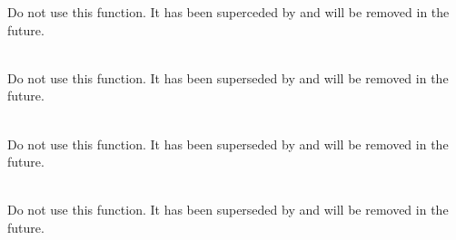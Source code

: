 \begin{DoxyRefList}
\label{deprecated__deprecated000013}%
%
Do not use this function. It has been superceded by  and will be removed in the future.  
\item[{\parbox[t]{\linewidth}{Global \doxylink{group___complex_f_f_t_deprecated_gab340cc2ca89d865287619ef70da7a62f}{arm\+\_\+cfft\+\_\+radix4\+\_\+init\+\_\+q15} (\doxylink{structarm__cfft__radix4__instance__q15}{arm\+\_\+cfft\+\_\+radix4\+\_\+instance\+\_\+q15} \texorpdfstring{$\ast$}{*}S, uint16\+\_\+t fft\+Len, uint8\+\_\+t ifft\+Flag, uint8\+\_\+t bit\+Reverse\+Flag)}}]\hfill \\
\label{deprecated__deprecated000014}%
%
Do not use this function. It has been superseded by  and will be removed in the future.  
\item[{\parbox[t]{\linewidth}{Global \doxylink{group___complex_f_f_t_deprecated_ga1102895d5206b25dec00e975e7f1c969}{arm\+\_\+cfft\+\_\+radix4\+\_\+init\+\_\+q31} (\doxylink{structarm__cfft__radix4__instance__q31}{arm\+\_\+cfft\+\_\+radix4\+\_\+instance\+\_\+q31} \texorpdfstring{$\ast$}{*}S, uint16\+\_\+t fft\+Len, uint8\+\_\+t ifft\+Flag, uint8\+\_\+t bit\+Reverse\+Flag)}}]\hfill \\
\label{deprecated__deprecated000015}%
%
Do not use this function. It has been superseded by  and will be removed in the future.  
\item[{\parbox[t]{\linewidth}{Global \doxylink{group___complex_f_f_t_deprecated_ga5f5e95ea7a6ad235f0fb7aff0eb55744}{arm\+\_\+cfft\+\_\+radix4\+\_\+q15} (const \doxylink{structarm__cfft__radix4__instance__q15}{arm\+\_\+cfft\+\_\+radix4\+\_\+instance\+\_\+q15} \texorpdfstring{$\ast$}{*}S, \doxylink{group__generic_types_gab5a8fb21a5b3b983d5f54f31614052ea}{q15\+\_\+t} \texorpdfstring{$\ast$}{*}p\+Src)}}]\hfill \\
\label{deprecated__deprecated000016}%
%
Do not use this function. It has been superseded by  and will be removed in the future.  
\item[{\parbox[t]{\linewidth}{Global \doxylink{group___complex_f_f_t_deprecated_ga8c4dba4da4613407676f7ce996a54465}{arm\+\_\+cfft\+\_\+radix4\+\_\+q31} (const \doxylink{structarm__cfft__radix4__instance__q31}{arm\+\_\+cfft\+\_\+radix4\+\_\+instance\+\_\+q31} \texorpdfstring{$\ast$}{*}S, \doxylink{group__generic_types_gadc89a3547f5324b7b3b95adec3806bc0}{q31\+\_\+t} \texorpdfstring{$\ast$}{*}p\+Src)}}]\hfill \\

\end{DoxyRefList}
